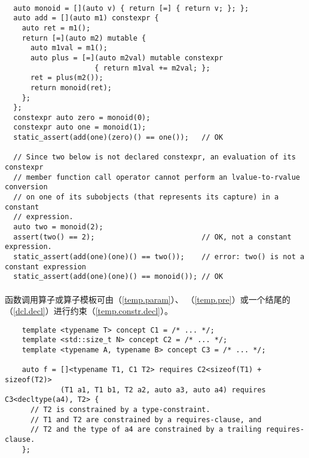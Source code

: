 \paragraph{} %
\begin{example}
  \begin{lstlisting}
  auto monoid = [](auto v) { return [=] { return v; }; };
  auto add = [](auto m1) constexpr {
    auto ret = m1();
    return [=](auto m2) mutable {
      auto m1val = m1();
      auto plus = [=](auto m2val) mutable constexpr
                     { return m1val += m2val; };
      ret = plus(m2());
      return monoid(ret);
    };
  };
  constexpr auto zero = monoid(0);
  constexpr auto one = monoid(1);
  static_assert(add(one)(zero)() == one());   // OK

  // Since two below is not declared constexpr, an evaluation of its constexpr
  // member function call operator cannot perform an lvalue-to-rvalue conversion
  // on one of its subobjects (that represents its capture) in a constant
  // expression.
  auto two = monoid(2);
  assert(two() == 2);                         // OK, not a constant expression.
  static_assert(add(one)(one)() == two());    // error: two() is not a constant expression
  static_assert(add(one)(one)() == monoid()); // OK
  \end{lstlisting}
\end{example}

\paragraph{} %
\begin{note}
  函数调用算子或算子模板可由（\ref{temp.param}）、
  （\ref{temp.pre}）或一个结尾的
  （\ref{dcl.decl}）进行约束（\ref{temp.constr.decl}）。

  \begin{example}
    \begin{lstlisting}
    template <typename T> concept C1 = /* ... */;
    template <std::size_t N> concept C2 = /* ... */;
    template <typename A, typename B> concept C3 = /* ... */;

    auto f = []<typename T1, C1 T2> requires C2<sizeof(T1) + sizeof(T2)>
             (T1 a1, T1 b1, T2 a2, auto a3, auto a4) requires C3<decltype(a4), T2> {
      // T2 is constrained by a type-constraint.
      // T1 and T2 are constrained by a requires-clause, and
      // T2 and the type of a4 are constrained by a trailing requires-clause.
    };
    \end{lstlisting}
  \end{example}

\end{note}

